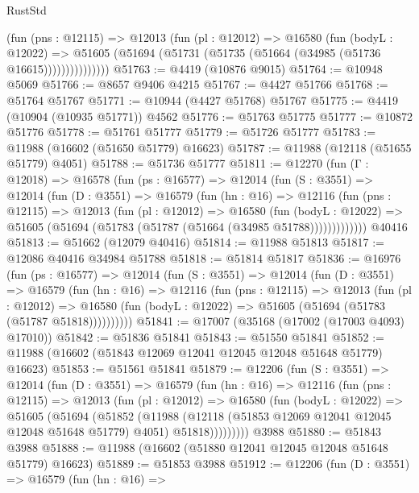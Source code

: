 \begin{lexlean}{RustStd}
\begin{coremodule}
                (fun (pns : @12115) =>
                @12013
                  (fun (pl : @12012) =>
                  @16580
                    (fun (bodyL : @12022) =>
                    @51605 (@51694 (@51731 (@51735 (@51664 (@34985 (@51736 @16615)))))))))))))))
@51763 := @4419 (@10876 @9015)
@51764 := @10948 @5069
@51766 := @8657 @9406 @4215
@51767 := @4427 @51766
@51768 := @51764 @51767
@51771 := @10944 (@4427 @51768) @51767
@51775 := @4419 (@10904 (@10935 @51771)) @4562
@51776 := @51763 @51775
@51777 := @10872 @51776
@51778 := @51761 @51777
@51779 := @51726 @51777
@51783 := @11988 (@16602 (@51650 @51779) @16623)
@51787 := @11988 (@12118 (@51655 @51779) @4051)
@51788 := @51736 @51777
@51811 := @12270
    (fun (Γ : @12018) =>
    @16578
      (fun (ps : @16577) =>
      @12014
        (fun (S : @3551) =>
        @12014
          (fun (D : @3551) =>
          @16579
            (fun (hn : @16) =>
            @12116
              (fun (pns : @12115) =>
              @12013
                (fun (pl : @12012) =>
                @16580
                  (fun (bodyL : @12022) =>
                  @51605 (@51694 (@51783 (@51787 (@51664 (@34985 @51788)))))))))))))
    @40416
@51813 := @51662 (@12079 @40416)
@51814 := @11988 @51813
@51817 := @12086 @40416 @34984 @51788
@51818 := @51814 @51817
@51836 := @16976
    (fun (ps : @16577) =>
    @12014
      (fun (S : @3551) =>
      @12014
        (fun (D : @3551) =>
        @16579
          (fun (hn : @16) =>
          @12116
            (fun (pns : @12115) =>
            @12013
              (fun (pl : @12012) =>
              @16580 (fun (bodyL : @12022) => @51605 (@51694 (@51783 (@51787 @51818))))))))))
@51841 := @17007 (@35168 (@17002 (@17003 @4093) @17010))
@51842 := @51836 @51841
@51843 := @51550 @51841
@51852 := @11988 (@16602 (@51843 @12069 @12041 @12045 @12048 @51648 @51779) @16623)
@51853 := @51561 @51841
@51879 := @12206
    (fun (S : @3551) =>
    @12014
      (fun (D : @3551) =>
      @16579
        (fun (hn : @16) =>
        @12116
          (fun (pns : @12115) =>
          @12013
            (fun (pl : @12012) =>
            @16580
              (fun (bodyL : @12022) =>
              @51605
                (@51694
                  (@51852
                    (@11988
                      (@12118 (@51853 @12069 @12041 @12045 @12048 @51648 @51779) @4051)
                      @51818)))))))))
    @3988
@51880 := @51843 @3988
@51888 := @11988 (@16602 (@51880 @12041 @12045 @12048 @51648 @51779) @16623)
@51889 := @51853 @3988
@51912 := @12206
    (fun (D : @3551) =>
    @16579
      (fun (hn : @16) =>

\end{coremodule}
\end{lexlean}

